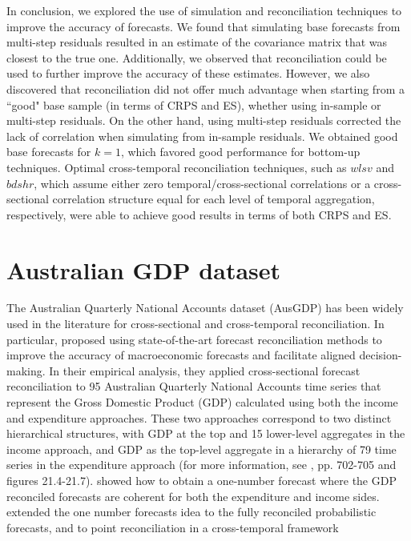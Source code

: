 \documentclass[a4paper,11pt]{article}
\theoremstyle{definition}
\begin{document}
In conclusion, we explored the use of simulation and reconciliation techniques to improve the accuracy of forecasts. We found that simulating base forecasts from multi-step residuals resulted in an estimate of the covariance matrix that was closest to the true one. Additionally, we observed that reconciliation could be used to further improve the accuracy of these estimates. However, we also discovered that reconciliation did not offer much advantage when starting from a “good" base sample (in terms of CRPS and ES), whether using in-sample or multi-step residuals. On the other hand, using multi-step residuals corrected the lack of correlation when simulating from in-sample residuals. We obtained good base forecasts for $k=1$, which favored good performance for bottom-up techniques. Optimal cross-temporal reconciliation techniques, such as $wlsv$ and $bdshr$, which assume either zero temporal/cross-sectional correlations or a cross-sectional correlation structure equal for each level of temporal aggregation, respectively, were able to achieve good results in terms of both CRPS and ES.

\section{Australian GDP dataset}\label{sec:ausgdp}

The Australian Quarterly National Accounts dataset (AusGDP) has been widely used in the literature for cross-sectional and cross-temporal reconciliation. In particular, \cite{athanasopoulos2020} proposed using state-of-the-art forecast reconciliation methods to improve the accuracy of macroeconomic forecasts and facilitate aligned decision-making. In their empirical analysis, they applied cross-sectional forecast reconciliation to 95 Australian Quarterly National Accounts time series that represent the Gross Domestic Product (GDP) calculated using both the income and expenditure approaches. These two approaches correspond to two distinct hierarchical structures, with GDP at the top and 15 lower-level aggregates in the income approach, and GDP as the top-level aggregate in a hierarchy of 79 time series in the expenditure approach (for more information, see \citealp{athanasopoulos2020}, pp. 702-705 and figures 21.4-21.7).
\cite{bisaglia2020} showed how to obtain a one-number forecast where the GDP reconciled forecasts are coherent for both the expenditure and income sides.
\cite{giro2022, difonzo2022c} extended the one number forecasts idea to the fully reconciled probabilistic forecasts, and \cite{difonzo2023} to point reconciliation in a cross-temporal framework
\end{document}
